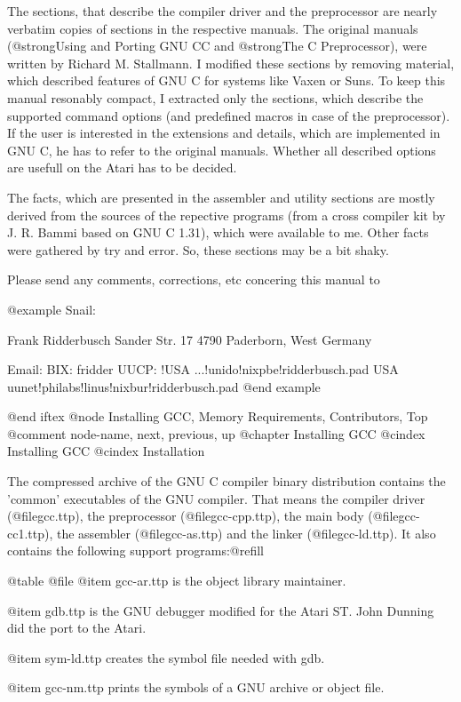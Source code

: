 The sections, that describe the compiler driver and the preprocessor are
nearly verbatim copies of sections in the respective manuals. The
original manuals (@strong{Using and Porting GNU CC} and @strong{The C
Preprocessor}), were written by Richard M. Stallmann. I modified these
sections by removing material, which described features of GNU C for
systems like Vaxen or Suns. To keep this manual resonably compact, I
extracted only the sections, which describe the supported command
options (and predefined macros in case of the preprocessor). If the user
is interested in the extensions and details, which are implemented in
GNU C, he has to refer to the original manuals. Whether all described
options are usefull on the Atari has to be decided. 

The facts, which are presented in the assembler and utility sections are
mostly derived from the sources of the repective programs (from a cross
compiler kit by J. R. Bammi based on GNU C 1.31), which were available to
me. Other facts were gathered by try and error. So, these sections may
be a bit shaky.

Please send any comments, corrections, etc concering this manual to

@example
Snail:

Frank Ridderbusch
Sander Str. 17
4790 Paderborn, West Germany

Email:
BIX:  fridder
UUCP: !USA            ...!unido!nixpbe!ridderbusch.pad
       USA  uunet!philabs!linus!nixbur!ridderbusch.pad
@end example

@end iftex
@node     Installing GCC, Memory Requirements, Contributors, Top
@comment  node-name,      next,                previous,     up
@chapter Installing GCC
@cindex Installing GCC
@cindex Installation

The compressed archive of the GNU C compiler binary distribution
contains the 'common' executables of the GNU compiler. That means the
compiler driver (@file{gcc.ttp}), the preprocessor (@file{gcc-cpp.ttp}),
the main body (@file{gcc-cc1.ttp}), the assembler (@file{gcc-as.ttp})
and  the linker (@file{gcc-ld.ttp}). It also contains the following
support programs:@refill

@table @file
@item gcc-ar.ttp
is the object library maintainer.

@item gdb.ttp
is the GNU debugger modified for the Atari ST. John Dunning did the
port to the Atari.

@item sym-ld.ttp
creates the symbol file needed with gdb.

@item gcc-nm.ttp
prints the symbols of a GNU archive or object file.

